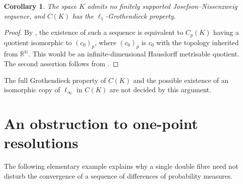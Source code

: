 \documentclass[a4paper,11pt]{amsart}
\theoremstyle{plain}
\newtheorem{corollary}[theorem]{Corollary}
\theoremstyle{definition}
\theoremstyle{remark}
\newcommand{\R}{\mathbb R}
\newcommand{\N}{\mathbb N}
\numberwithin{equation}{section}
\begin{document}
\begin{corollary}\label{cor:fsjn}
The space $K$ admits no finitely supported Josefson--Nissenzweig sequence, and $C(K)$ has the $\ell_1$-Grothendieck property.
\end{corollary}
\begin{proof}
By \cite[Theorem~1]{BKS2019}, the existence of such a sequence is equivalent to $C_p(K)$ having a quotient isomorphic to $(c_0)_p$, where $(c_0)_p$ is $c_0$ with the topology inherited from $\R^\N$. This would be an infinite-dimensional Hausdorff metrisable quotient. The second assertion follows from \cite[Theorem~4.1]{KSZ}.
\end{proof}

The full Grothendieck property of $C(K)$ and the possible existence of an isomorphic copy of $\ell_\infty$ in $C(K)$ are not decided by this argument.

\section{An obstruction to one-point resolutions}\label{sec:obstruction}

The following elementary example explains why a single double fibre need not disturb the convergence of a sequence of differences of probability measures.
\end{document}

